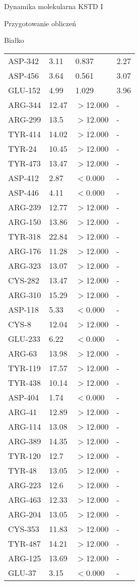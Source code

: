 \begin{section}{Dynamika molekularna KSTD I}
\begin{subsection}{Przygotowanie obliczeń}
\begin{subsubsection}{Białko}
\begin{longtable}{| p{} | p{} | p{} | p{} |}
ASP-342 & 3.11 & 0.837 & 2.27\\
ASP-456 & 3.64 & 0.561 & 3.07\\
GLU-152 & 4.99 & 1.029 & 3.96\\
ARG-344 & 12.47 & $>$12.000 & -\\
ARG-299 & 13.5 & $>$12.000 & -\\
TYR-414 & 14.02 & $>$12.000 & -\\
TYR-24 & 10.45 & $>$12.000 & -\\
TYR-473 & 13.47 & $>$12.000 & -\\
ASP-412 & 2.87 & $<$0.000 & -\\
ASP-446 & 4.11 & $<$0.000 & -\\
ARG-239 & 12.77 & $>$12.000 & -\\
ARG-150 & 13.86 & $>$12.000 & -\\
TYR-318 & 22.84 & $>$12.000 & -\\
ARG-176 & 11.28 & $>$12.000 & -\\
ARG-323 & 13.07 & $>$12.000 & -\\
CYS-282 & 13.47 & $>$12.000 & -\\
ARG-310 & 15.29 & $>$12.000 & -\\
ASP-118 & 5.33 & $<$0.000 & -\\
CYS-8 & 12.04 & $>$12.000 & -\\
GLU-233 & 6.22 & $<$0.000 & -\\
ARG-63 & 13.98 & $>$12.000 & -\\
TYR-119 & 17.57 & $>$12.000 & -\\
TYR-438 & 10.14 & $>$12.000 & -\\
ASP-404 & 1.74 & $<$0.000 & -\\
ARG-41 & 12.89 & $>$12.000 & -\\
ARG-114 & 13.08 & $>$12.000 & -\\
ARG-389 & 14.35 & $>$12.000 & -\\
TYR-120 & 12.7 & $>$12.000 & -\\
TYR-48 & 13.05 & $>$12.000 & -\\
ARG-223 & 12.6 & $>$12.000 & -\\
ARG-463 & 12.33 & $>$12.000 & -\\
ARG-204 & 13.05 & $>$12.000 & -\\
CYS-353 & 11.83 & $>$12.000 & -\\
TYR-487 & 14.21 & $>$12.000 & -\\
ARG-125 & 13.69 & $>$12.000 & -\\
GLU-37 & 3.15 & $<$0.000 & -\\

\end{longtable}
\end{subsubsection}
\end{subsection}
\end{section}
